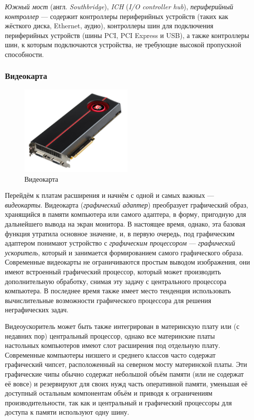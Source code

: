 \emph{Южный мост} (англ. \emph{Southbridge}), \emph{ICH} (\emph{I/O controller hub}), \emph{периферийный контроллер} --- содержит контроллеры периферийных устройств (таких как жёсткого диска, Ethernet, аудио), контроллеры шин для подключения периферийных устройств (шины PCI, PCI Express и USB), а также контроллеры шин, к которым подключаются устройства, не требующие высокой пропускной способности.

\subsubsection{Видеокарта}\label{base:introduction:components:videocard}
\begin{figure}[h!]
 \centering
 \includegraphics[width=0.5\textwidth]{base/Introduction/Videocard.jpg}
 \caption{Видеокарта}
 \label{base:introduction:components:videocard:videocardpic}
\end{figure}
Перейдём к платам расширения и начнём с одной и самых важных --- \emph{видеокарты}.
Видеокарта (\emph{графический адаптер}) преобразует графический образ, хранящийся в памяти компьютера или самого адаптера, в форму, пригодную для дальнейшего вывода на экран монитора.
В настоящее время, однако, эта базовая функция утратила основное значение, и, в первую очередь, под графическим адаптером понимают устройство с \emph{графическим процессором} --- \emph{графический ускоритель}, который и занимается формированием самого графического образа.
Современные видеокарты не ограничиваются простым выводом изображения, они имеют встроенный графический процессор, который может производить дополнительную обработку, снимая эту задачу с центрального процессора компьютера.
В последнее время также имеет место тенденция использовать вычислительные возможности графического процессора для решения неграфических задач.

Видеоускоритель может быть также интегрирован в материнскую плату или (с недавних пор) центральный процессор, однако все материнские платы настольных компьютеров имеют слот расширения под отдельную плату.
Современные компьютеры низшего и среднего классов часто содержат графический чипсет, расположенный на северном мосту материнской платы.
Эти графические чипы обычно содержат небольшой объём памяти (или не содержат её вовсе) и резервируют для своих нужд часть оперативной памяти, уменьшая её доступный остальным компонентам объём и приводя к ограничениям производительности, так как и центральный и графический процессоры для доступа к памяти используют одну шину.

